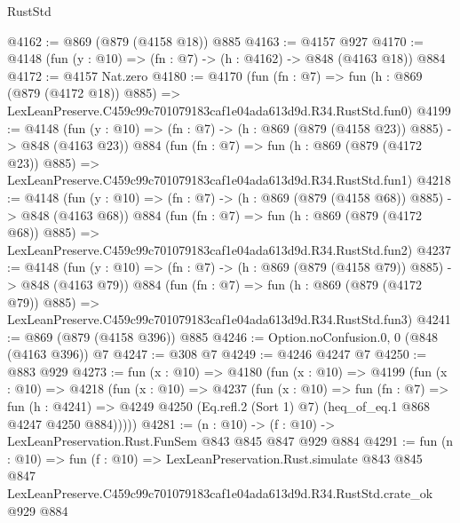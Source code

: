 \begin{lexlean}{RustStd}
\begin{coremodule}
@4162 := @869 (@879 (@4158 @18)) @885
@4163 := @4157 @927
@4170 := @4148 (fun (y : @10) => (fn : @7) -> (h : @4162) -> @848 (@4163 @18)) @884
@4172 := @4157 Nat.zero
@4180 := @4170
    (fun (fn : @7) =>
    fun (h : @869 (@879 (@4172 @18)) @885) =>
    LexLeanPreserve.C459c99c701079183caf1e04ada613d9d.R34.RustStd.fun0)
@4199 := @4148
    (fun (y : @10) => (fn : @7) -> (h : @869 (@879 (@4158 @23)) @885) -> @848 (@4163 @23))
    @884
    (fun (fn : @7) =>
    fun (h : @869 (@879 (@4172 @23)) @885) =>
    LexLeanPreserve.C459c99c701079183caf1e04ada613d9d.R34.RustStd.fun1)
@4218 := @4148
    (fun (y : @10) => (fn : @7) -> (h : @869 (@879 (@4158 @68)) @885) -> @848 (@4163 @68))
    @884
    (fun (fn : @7) =>
    fun (h : @869 (@879 (@4172 @68)) @885) =>
    LexLeanPreserve.C459c99c701079183caf1e04ada613d9d.R34.RustStd.fun2)
@4237 := @4148
    (fun (y : @10) => (fn : @7) -> (h : @869 (@879 (@4158 @79)) @885) -> @848 (@4163 @79))
    @884
    (fun (fn : @7) =>
    fun (h : @869 (@879 (@4172 @79)) @885) =>
    LexLeanPreserve.C459c99c701079183caf1e04ada613d9d.R34.RustStd.fun3)
@4241 := @869 (@879 (@4158 @396)) @885
@4246 := Option.noConfusion.{0, 0} (@848 (@4163 @396)) @7
@4247 := @308 @7
@4249 := @4246 @4247 @7
@4250 := @883 @929
@4273 := fun (x : @10) =>
  @4180
    (fun (x : @10) =>
    @4199
      (fun (x : @10) =>
      @4218
        (fun (x : @10) =>
        @4237
          (fun (x : @10) =>
          fun (fn : @7) =>
          fun (h : @4241) =>
          @4249 @4250 (Eq.refl.{2} (Sort 1) @7) (heq_of_eq.{1} @868 @4247 @4250 @884)))))
@4281 := (n : @10) -> (f : @10) -> LexLeanPreservation.Rust.FunSem @843 @845 @847 @929 @884
@4291 := fun (n : @10) =>
  fun (f : @10) =>
  LexLeanPreservation.Rust.simulate
    @843
    @845
    @847
    LexLeanPreserve.C459c99c701079183caf1e04ada613d9d.R34.RustStd.crate_ok
    @929
    @884
\end{coremodule}
\end{lexlean}
